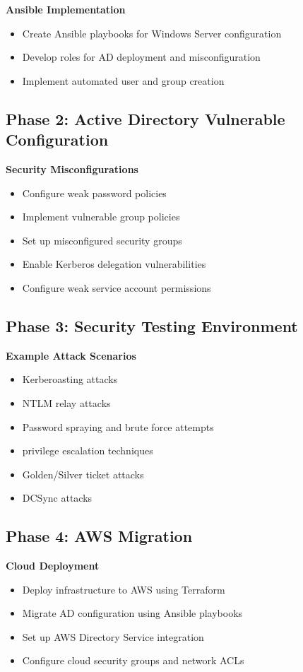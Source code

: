 \documentclass[11pt,a4paper]{article}
\begin{document}
\textbf{Ansible Implementation}
\begin{itemize}
    \item Create Ansible playbooks for Windows Server configuration
    \item Develop roles for AD deployment and misconfiguration
    \item Implement automated user and group creation
\end{itemize}

\subsection{Phase 2: Active Directory Vulnerable Configuration}
\textbf{Security Misconfigurations}
\begin{itemize}
    \item Configure weak password policies
    \item Implement vulnerable group policies
    \item Set up misconfigured security groups
    \item Enable Kerberos delegation vulnerabilities
    \item Configure weak service account permissions
\end{itemize}

\subsection{Phase 3: Security Testing Environment}
\textbf{Example Attack Scenarios}
\begin{itemize}
    \item Kerberoasting attacks
    \item NTLM relay attacks
    \item Password spraying and brute force attempts
    \item privilege escalation techniques
    \item Golden/Silver ticket attacks
    \item DCSync attacks
\end{itemize}

\subsection{Phase 4: AWS Migration}
\textbf{Cloud Deployment}
\begin{itemize}
    \item Deploy infrastructure to AWS using Terraform
    \item Migrate AD configuration using Ansible playbooks
    \item Set up AWS Directory Service integration
    \item Configure cloud security groups and network ACLs
\end{itemize}
\end{document}
